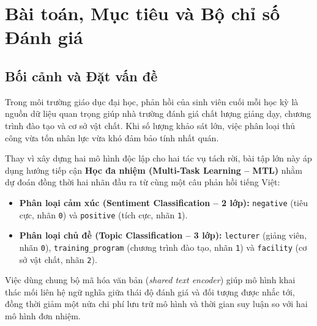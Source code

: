 \documentclass[a4paper,12pt]{article}
\begin{document}
\tableofcontents
\newpage

\section{Bài toán, Mục tiêu và Bộ chỉ số Đánh giá}

\subsection{Bối cảnh và Đặt vấn đề}
Trong môi trường giáo dục đại học, phản hồi của sinh viên cuối mỗi học kỳ là nguồn dữ liệu quan trọng giúp nhà trường đánh giá chất lượng giảng dạy, chương trình đào tạo và cơ sở vật chất. Khi số lượng khảo sát lớn, việc phân loại thủ công vừa tốn nhân lực vừa khó đảm bảo tính nhất quán.

Thay vì xây dựng hai mô hình độc lập cho hai tác vụ tách rời, bài tập lớn này áp dụng hướng tiếp cận \textbf{Học đa nhiệm (Multi-Task Learning -- MTL)} nhằm dự đoán đồng thời hai nhãn đầu ra từ cùng một câu phản hồi tiếng Việt:
\begin{itemize}
    \item \textbf{Phân loại cảm xúc (Sentiment Classification -- 2 lớp):} \texttt{negative} (tiêu cực, nhãn \texttt{0}) và \texttt{positive} (tích cực, nhãn \texttt{1}).
    \item \textbf{Phân loại chủ đề (Topic Classification -- 3 lớp):} \texttt{lecturer} (giảng viên, nhãn \texttt{0}), \texttt{training\_program} (chương trình đào tạo, nhãn \texttt{1}) và \texttt{facility} (cơ sở vật chất, nhãn \texttt{2}).
\end{itemize}

Việc dùng chung bộ mã hóa văn bản (\textit{shared text encoder}) giúp mô hình khai thác mối liên hệ ngữ nghĩa giữa thái độ đánh giá và đối tượng được nhắc tới, đồng thời giảm một nửa chi phí lưu trữ mô hình và thời gian suy luận so với hai mô hình đơn nhiệm.
\end{document}
